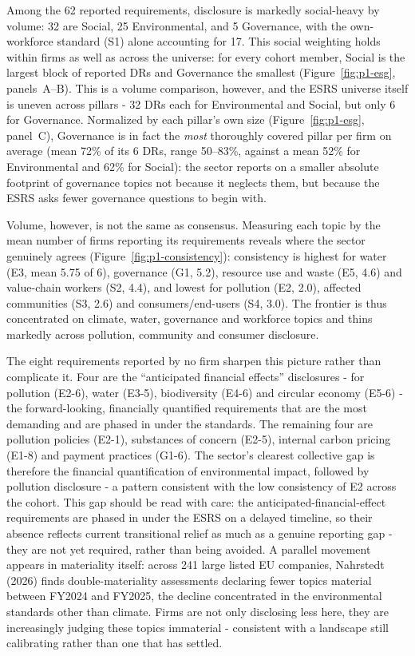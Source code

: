 Among the 62 reported requirements, disclosure is markedly social-heavy by
volume: 32 are Social, 25 Environmental, and 5 Governance, with the
own-workforce standard (S1) alone accounting for 17. This social weighting
holds within firms as well as across the universe: for every cohort
member, Social is the largest block of reported DRs and Governance the
smallest (Figure~\ref{fig:p1-esg}, panels~A--B). This is a volume comparison,
however, and the ESRS universe itself is uneven across pillars - 32 DRs each
for Environmental and Social, but only 6 for Governance. Normalized by each
pillar's own size (Figure~\ref{fig:p1-esg}, panel~C), Governance is in fact
the \emph{most} thoroughly covered pillar per firm on average (mean 72\% of
its 6 DRs, range 50--83\%, against a mean 52\% for Environmental and 62\% for
Social): the sector reports on a smaller
absolute footprint of governance topics not because it neglects them, but
because the ESRS asks fewer governance questions to begin with.

Volume, however, is not the same as consensus. Measuring each topic by the
mean number of firms reporting its requirements reveals where the sector
genuinely agrees (Figure~\ref{fig:p1-consistency}): consistency is highest for
water (E3, mean 5.75 of 6), governance (G1, 5.2), resource use and waste
(E5, 4.6) and value-chain workers (S2, 4.4), and lowest for pollution (E2,
2.0), affected communities (S3, 2.6) and consumers/end-users (S4, 3.0).
The frontier is thus concentrated on climate, water, governance and
workforce topics and thins markedly across pollution, community and
consumer disclosure.

The eight requirements reported by no firm sharpen this picture rather
than complicate it. Four are the ``anticipated financial effects''
disclosures - for pollution (E2-6), water (E3-5), biodiversity (E4-6)
and circular economy (E5-6) - the forward-looking, financially
quantified requirements that are the most demanding and are phased in under
the standards. The remaining four are pollution policies (E2-1),
substances of concern (E2-5), internal carbon pricing (E1-8) and payment
practices (G1-6). The sector's clearest collective gap is therefore
the financial quantification of environmental impact, followed by
pollution disclosure - a pattern consistent with the low consistency of E2
across the cohort. This gap should be read with care: the
anticipated-financial-effect requirements are phased in under the ESRS on a
delayed timeline, so their absence reflects current transitional relief as much as
a genuine reporting gap - they are not yet required, rather than being avoided. A parallel movement appears
in materiality itself: across 241 large listed EU companies, Nahrstedt (2026)
finds double-materiality assessments declaring fewer topics material between
FY2024 and FY2025, the decline concentrated in the environmental standards other
than climate. Firms are not only disclosing less here, they are increasingly
judging these topics immaterial - consistent with a landscape still calibrating
rather than one that has settled.


